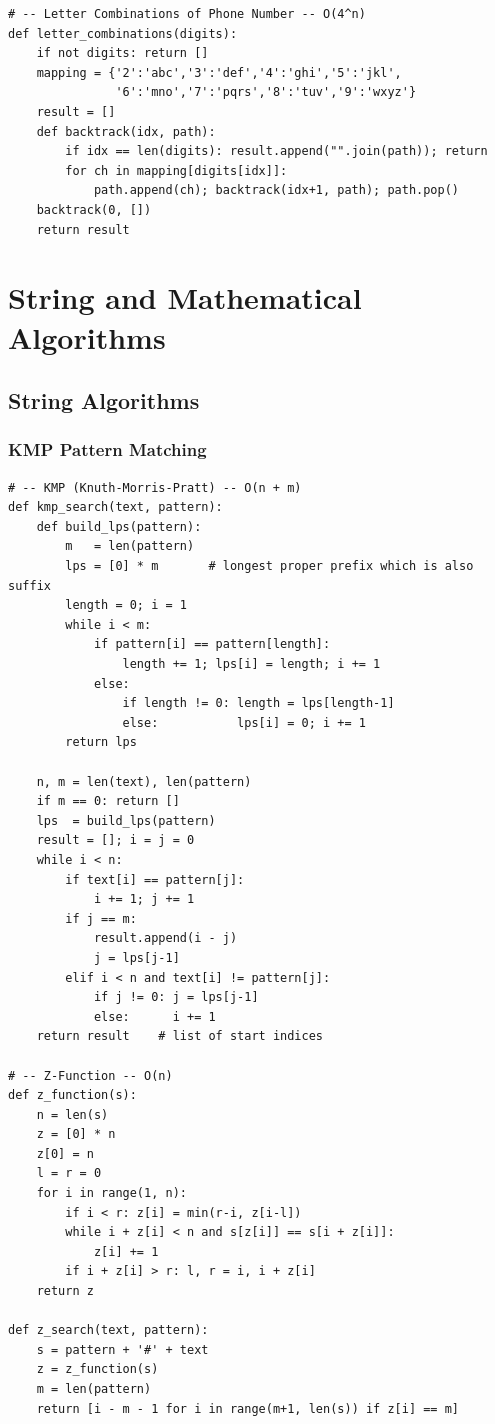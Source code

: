 \documentclass[11pt,a4paper]{report}
\begin{document}
\begin{lstlisting}
# -- Letter Combinations of Phone Number -- O(4^n)
def letter_combinations(digits):
    if not digits: return []
    mapping = {'2':'abc','3':'def','4':'ghi','5':'jkl',
               '6':'mno','7':'pqrs','8':'tuv','9':'wxyz'}
    result = []
    def backtrack(idx, path):
        if idx == len(digits): result.append("".join(path)); return
        for ch in mapping[digits[idx]]:
            path.append(ch); backtrack(idx+1, path); path.pop()
    backtrack(0, [])
    return result
\end{lstlisting}


\part{String and Mathematical Algorithms}

\chapter{String Algorithms}

\section{KMP Pattern Matching}

\begin{lstlisting}
# -- KMP (Knuth-Morris-Pratt) -- O(n + m)
def kmp_search(text, pattern):
    def build_lps(pattern):
        m   = len(pattern)
        lps = [0] * m       # longest proper prefix which is also suffix
        length = 0; i = 1
        while i < m:
            if pattern[i] == pattern[length]:
                length += 1; lps[i] = length; i += 1
            else:
                if length != 0: length = lps[length-1]
                else:           lps[i] = 0; i += 1
        return lps

    n, m = len(text), len(pattern)
    if m == 0: return []
    lps  = build_lps(pattern)
    result = []; i = j = 0
    while i < n:
        if text[i] == pattern[j]:
            i += 1; j += 1
        if j == m:
            result.append(i - j)
            j = lps[j-1]
        elif i < n and text[i] != pattern[j]:
            if j != 0: j = lps[j-1]
            else:      i += 1
    return result    # list of start indices

# -- Z-Function -- O(n)
def z_function(s):
    n = len(s)
    z = [0] * n
    z[0] = n
    l = r = 0
    for i in range(1, n):
        if i < r: z[i] = min(r-i, z[i-l])
        while i + z[i] < n and s[z[i]] == s[i + z[i]]:
            z[i] += 1
        if i + z[i] > r: l, r = i, i + z[i]
    return z

def z_search(text, pattern):
    s = pattern + '#' + text
    z = z_function(s)
    m = len(pattern)
    return [i - m - 1 for i in range(m+1, len(s)) if z[i] == m]
\end{lstlisting}
\end{document}
